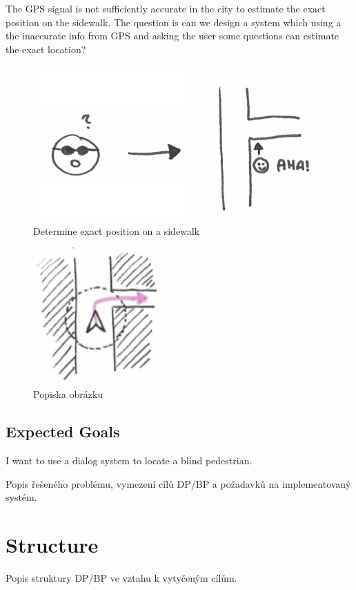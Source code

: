 	The GPS signal is not sufficiently accurate in the city to estimate the exact position on the sidewalk. The question is can we design a system which using a the inaccurate info from GPS and asking the user some questions can estimate the exact location?
	 
\begin{figure}[h]
	\centering
	\includegraphics[width=0.7\linewidth]{figures/introduction/determine-exact-position-on-sidewalk}
	\caption[Determine exact position on a sidewalk]{Determine exact position on a sidewalk}
	\label{fig:determine-exact-position-on-sidewalk}
\end{figure}
	
	
	
\begin{figure}[h]
	\centering
	\includegraphics[width=5cm]{figures/introduction/gps-shows}
	\caption[Current Navigations]{Popiska obrázku}
	\label{fig:gps-shows}
\end{figure}

	
	

	
	
	
	
	\section{Expected Goals}
	
	I want to use a dialog system to locate a blind pedestrian.
	
	Popis řešeného problému, vymezení cílů DP/BP a požadavků na implementovaný systém.
	
	
	\chapter{Structure}
	
	Popis struktury DP/BP ve vztahu k vytyčeným cílům.